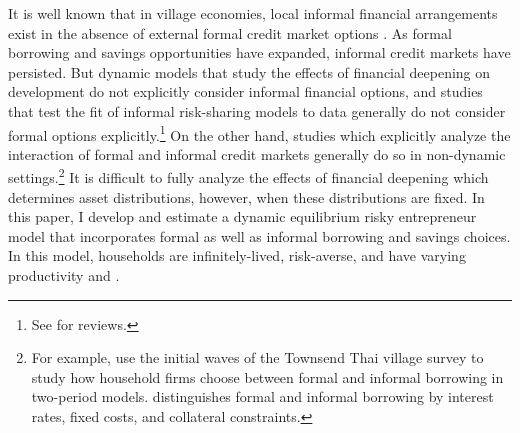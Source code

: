 \newcommand{\introfootone}{For example, \textcite{gine_access_2011, karaivanov_disadvantages_2018} use the initial waves of the Townsend Thai village survey to study how household firms choose between formal and informal borrowing in two-period models. \textcite{gine_access_2011} distinguishes formal and informal borrowing by interest rates, fixed costs, and collateral constraints.}

It is well known that in village economies, local informal financial arrangements exist in the absence of external formal credit market options \autocite{udry_risk_1994, townsend_risk_1994}. As formal borrowing and savings opportunities have expanded, informal credit markets have persisted. But dynamic models that study the effects of financial deepening on development do not explicitly consider informal financial options, and studies that test the fit of informal risk-sharing models to data generally do not consider formal options explicitly.\footnote{See \textcite{townsend_financial_2010, buera_entrepreneurship_2015} for reviews.} On the other hand, studies which explicitly analyze the interaction of formal and informal credit markets generally do so in non-dynamic settings.\footnote{\introfootone} It is difficult to fully analyze the effects of financial deepening which determines asset distributions, however, when these distributions are fixed. In this paper, I develop and estimate a dynamic equilibrium risky entrepreneur model that incorporates formal as well as informal borrowing and savings choices. In this model, households are infinitely-lived, risk-averse, and have varying productivity and \CZH.

